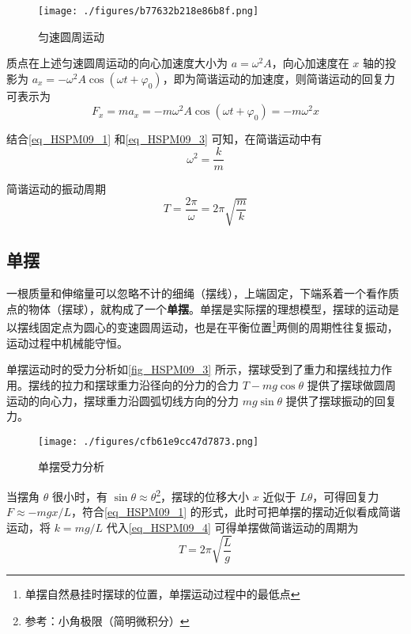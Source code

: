 \begin{figure}[ht]
\centering
\texttt{[image: ./figures/b77632b218e86b8f.png]}
\caption{匀速圆周运动} \label{fig_HSPM09_4}
\end{figure}

质点在上述匀速圆周运动的向心加速度大小为 $a=\omega^2 A$，向心加速度在 $x$ 轴的投影为 $a_x=-\omega^2 A\cos(\omega t + \varphi_0)$，即为简谐运动的加速度，则简谐运动的回复力可表示为
\begin{equation}\label{eq_HSPM09_3}
F_x=ma_x=-m\omega^2 A\cos(\omega t + \varphi_0)= -m\omega^2 x
\end{equation}

结合\autoref{eq_HSPM09_1} 和\autoref{eq_HSPM09_3} 可知，在简谐运动中有
\begin{equation}
\omega^2=\frac km
\end{equation}

简谐运动的振动周期
\begin{equation}\label{eq_HSPM09_4}
T=\frac {2\pi}{\omega}=2\pi\sqrt{\frac mk}
\end{equation}


\subsection{单摆}

一根质量和伸缩量可以忽略不计的细绳（摆线），上端固定，下端系着一个看作质点的物体（摆球），就构成了一个\textbf{单摆}。单摆是实际摆的理想模型，摆球的运动是以摆线固定点为圆心的变速圆周运动，也是在平衡位置\footnote{单摆自然悬挂时摆球的位置，单摆运动过程中的最低点}两侧的周期性往复振动，运动过程中机械能守恒。

单摆运动时的受力分析如\autoref{fig_HSPM09_3} 所示，摆球受到了重力和摆线拉力作用。摆线的拉力和摆球重力沿径向的分力的合力 $T-mg\cos\theta$ 提供了摆球做圆周运动的向心力，摆球重力沿圆弧切线方向的分力 $mg\sin\theta$ 提供了摆球振动的回复力。

\begin{figure}[ht]
\centering
\texttt{[image: ./figures/cfb61e9cc47d7873.png]}
\caption{单摆受力分析} \label{fig_HSPM09_3}
\end{figure}

当摆角 $\theta$ 很小时，有 $\sin\theta \approx \theta$\footnote{参考：小角极限（简明微积分）}，摆球的位移大小 $x$ 近似于 $L\theta$，可得回复力 $F \approx -mgx/L$，符合\autoref{eq_HSPM09_1} 的形式，此时可把单摆的摆动近似看成简谐运动，将 $k=mg/L$ 代入\autoref{eq_HSPM09_4} 可得单摆做简谐运动的周期为
\begin{equation}
T=2\pi\sqrt{\frac Lg}
\end{equation}

